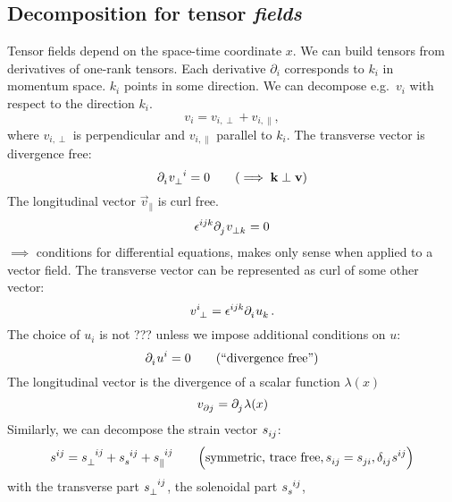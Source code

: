 \subsection{Decomposition for tensor \emph{fields}}
Tensor fields depend on the space-time coordinate $x$.
We can build tensors from derivatives of one-rank tensors.
Each derivative $\partial_i$ corresponds to $k_i$ in momentum space.
$k_i$ points in some direction.
We can decompose e.g.\ $v_i$ with respect to the direction $k_i$.
\begin{equation}
    v_i = v_{i,\perp} + v_{i,\parallel},
\end{equation}
where $v_{i,\perp}$ is perpendicular and $v_{i,\parallel}$ parallel to $k_i$.
The transverse vector is divergence free:
\begin{equation}
    \tensor{\partial}{_i} \tensor{v}{_\perp^i} = 0 \qquad \left( \implies \vec{k} \perp \vec{v} \right)
\end{equation}
The longitudinal vector $\vec{v}_\parallel$ is curl free.
\begin{equation}
    \tensor{\epsilon}{^i^j^k} \tensor{\partial}{_j} \tensor{v}{_\perp_k} = 0
\end{equation}
$\implies$ conditions for differential equations, makes only sense when applied to a vector field.
The transverse vector can be represented as curl of some other vector:
\begin{equation}
    \tensor{v}{^i_\perp} = \tensor{\epsilon}{^i^j^k} \tensor{\partial}{_i} \tensor{u}{_k} \,.
\end{equation}
The choice of $u_i$ is not ??? unless we impose additional conditions on $u$:
\begin{equation}
    \tensor{\partial}{_i} \tensor{u}{^i} = 0 \qquad \left( \text{``divergence free''} \right)
\end{equation}
The longitudinal vector is the divergence of a scalar function $\lambda(x)$
\begin{equation}
    \tensor{v}{_\partial_j} = \tensor{\partial}{_j} \lambda(x)
\end{equation}
Similarly, we can decompose the strain vector $\tensor{s}{_i_j}$:
\begin{equation}
    \tensor{s}{^i^j} = \tensor{s}{_{\perp}^i^j} + \tensor{s}{_s^i^j} + \tensor{s}{_{\parallel}^i^j}
    \qquad \left( \text{symmetric, trace free}, \tensor{s}{_i_j} = \tensor{s}{_j_i}, \tensor{\delta}{_i_j} \tensor{s}{^i^j} \right)
\end{equation}
with the transverse part $\tensor{s}{_\perp^i^j}$, the solenoidal part $\tensor{s}{_s^i^j}$,
